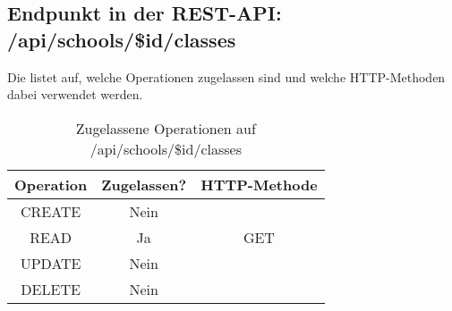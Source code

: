 \subsection{Endpunkt in der REST-API: /api/schools/\$id/classes}
Die  listet auf, welche Operationen zugelassen sind und welche HTTP-Methoden dabei verwendet werden. 

\begin{table}[!htbp]
	\begin{tabular}{|c|c|c|}
		\hline
			\textbf{Operation} & \textbf{Zugelassen?} & \textbf{HTTP-Methode} \\ \hline
			CREATE & Nein & \\ \hline 
			READ & Ja & GET \\ \hline
			UPDATE & Nein & \\ \hline 
			DELETE & Nein & \\ \hline
	\end{tabular}

		\caption{Zugelassene Operationen auf /api/schools/\$id/classes}
		\label{tab:rest:api:schools:id:classes:meth}
\end{table}

